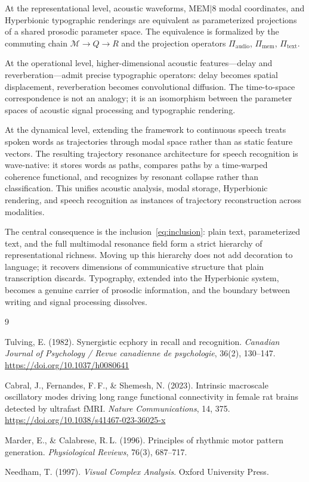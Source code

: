 \documentclass[12pt, a4paper]{article}
\begin{document}
At the representational level, acoustic waveforms, MEM$|$8 modal coordinates, and Hyperbionic typographic renderings are equivalent as parameterized projections of a shared prosodic parameter space. The equivalence is formalized by the commuting chain $\mathcal{M} \to Q \to R$ and the projection operators $\Pi_{\mathrm{audio}}$, $\Pi_{\mathrm{mem}}$, $\Pi_{\mathrm{text}}$.

At the operational level, higher-dimensional acoustic features---delay and reverberation---admit precise typographic operators: delay becomes spatial displacement, reverberation becomes convolutional diffusion. The time-to-space correspondence is not an analogy; it is an isomorphism between the parameter spaces of acoustic signal processing and typographic rendering.

At the dynamical level, extending the framework to continuous speech treats spoken words as trajectories through modal space rather than as static feature vectors. The resulting trajectory resonance architecture for speech recognition is wave-native: it stores words as paths, compares paths by a time-warped coherence functional, and recognizes by resonant collapse rather than classification. This unifies acoustic analysis, modal storage, Hyperbionic rendering, and speech recognition as instances of trajectory reconstruction across modalities.

The central consequence is the inclusion~\eqref{eq:inclusion}: plain text, parameterized text, and the full multimodal resonance field form a strict hierarchy of representational richness. Moving up this hierarchy does not add decoration to language; it recovers dimensions of communicative structure that plain transcription discards. Typography, extended into the Hyperbionic system, becomes a genuine carrier of prosodic information, and the boundary between writing and signal processing dissolves.

\begin{thebibliography}{9}

Tulving, E. (1982).
Synergistic ecphory in recall and recognition.
\textit{Canadian Journal of Psychology / Revue canadienne de psychologie}, 36(2), 130--147.
\url{https://doi.org/10.1037/h0080641}

Cabral, J., Fernandes, F.\,F., \& Shemesh, N. (2023).
Intrinsic macroscale oscillatory modes driving long range functional connectivity in female rat brains detected by ultrafast fMRI.
\textit{Nature Communications}, 14, 375.
\url{https://doi.org/10.1038/s41467-023-36025-x}

Marder, E., \& Calabrese, R.\,L. (1996).
Principles of rhythmic motor pattern generation.
\textit{Physiological Reviews}, 76(3), 687--717.

Needham, T. (1997).
\textit{Visual Complex Analysis}.
Oxford University Press.

\end{thebibliography}
\end{document}

